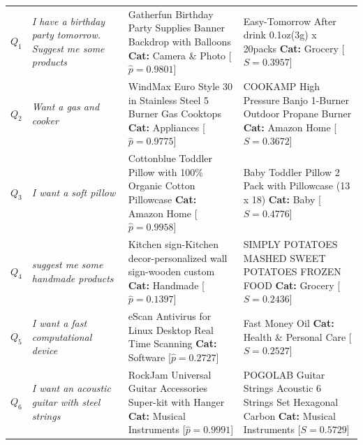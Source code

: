 \documentclass[11pt]{article}
\begin{document}
\begin{longtable}{p{0.6cm} p{3.1cm} p{5.6cm} p{5.6cm}}
  $Q_1$ & \textit{I have a birthday party tomorrow. Suggest me some products}
        & Gatherfun Birthday Party Supplies Banner Backdrop with Balloons \newline \textbf{Cat:} Camera \& Photo \hfill [$\hat{p} = 0.9801$]
        & Easy-Tomorrow After drink 0.1oz(3g) x 20packs \newline \textbf{Cat:} Grocery \hfill [$S = 0.3957$] \\
  \addlinespace
  $Q_2$ & \textit{Want a gas and cooker}
        & WindMax Euro Style 30 in Stainless Steel 5 Burner Gas Cooktops \newline \textbf{Cat:} Appliances \hfill [$\hat{p} = 0.9775$]
        & COOKAMP High Pressure Banjo 1-Burner Outdoor Propane Burner \newline \textbf{Cat:} Amazon Home \hfill [$S = 0.3672$] \\
  \addlinespace
  $Q_3$ & \textit{I want a soft pillow}
        & Cottonblue Toddler Pillow with 100\% Organic Cotton Pillowcase \newline \textbf{Cat:} Amazon Home \hfill [$\hat{p} = 0.9958$]
        & Baby Toddler Pillow 2 Pack with Pillowcase (13 x 18) \newline \textbf{Cat:} Baby \hfill [$S = 0.4776$] \\
  \addlinespace
  $Q_4$ & \textit{suggest me some handmade products}
        & Kitchen sign-Kitchen decor-personalized wall sign-wooden custom \newline \textbf{Cat:} Handmade \hfill [$\hat{p} = 0.1397$]
        & SIMPLY POTATOES MASHED SWEET POTATOES FROZEN FOOD \newline \textbf{Cat:} Grocery \hfill [$S = 0.2436$] \\
  \addlinespace
  $Q_5$ & \textit{I want a fast computational device}
        & eScan Antivirus for Linux Desktop Real Time Scanning \newline \textbf{Cat:} Software \hfill [$\hat{p} = 0.2727$]
        & Fast Money Oil \newline \textbf{Cat:} Health \& Personal Care \hfill [$S = 0.2527$] \\
  \addlinespace
  $Q_6$ & \textit{I want an acoustic guitar with steel strings}
        & RockJam Universal Guitar Accessories Super-kit with Hanger \newline \textbf{Cat:} Musical Instruments \hfill [$\hat{p} = 0.9991$]
        & POGOLAB Guitar Strings Acoustic 6 Strings Set Hexagonal Carbon \newline \textbf{Cat:} Musical Instruments \hfill [$S = 0.5729$] \\

\end{longtable}
\end{document}

